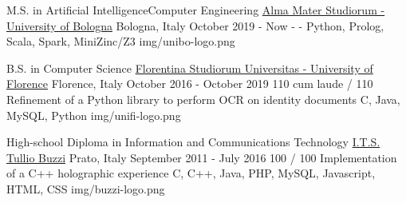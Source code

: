 
\begin{cventries}

  \logocventry
    {M.S. in Artificial Intelligence{\enskip\cdotp\enskip}Computer Engineering}
    {\href{https://www.unibo.it/en/homepage}{Alma Mater Studiorum - University of Bologna}}
    {Bologna, Italy}
    {October 2019 - Now}
    {
      \cvedu
        {-}
        {-}
        {Python, Prolog, Scala, Spark, MiniZinc/Z3}
    }
    {img/unibo-logo.png}

  \logocventry
    {B.S. in Computer Science}
    {\href{https://www.unifi.it/}{Florentina Studiorum Universitas - University of Florence}}
    {Florence, Italy}
    {October 2016 - October 2019}
    {
      \cvedu
        {110 cum laude / 110}
        {Refinement of a Python library to perform OCR on identity documents}
        {C, Java, MySQL, Python}
    }
    {img/unifi-logo.png}

  \logocventry
    {High-school Diploma in Information and Communications Technology}
    {\href{https://www.tulliobuzzi.edu.it/}{I.T.S. Tullio Buzzi}}
    {Prato, Italy}
    {September 2011 - July 2016}
    {
      \cvedu
        {100 / 100}
        {Implementation of a C++ holographic experience}
        {C, C++, Java, PHP, MySQL, Javascript, HTML, CSS}
    }
    {img/buzzi-logo.png}

\end{cventries}
